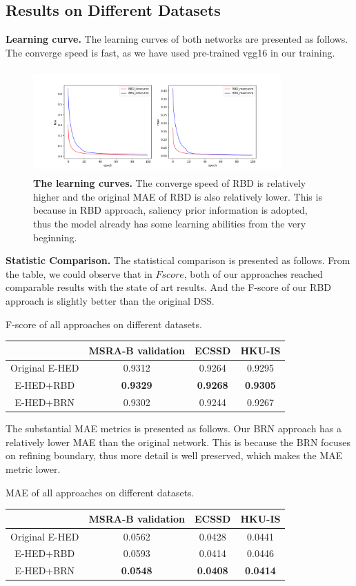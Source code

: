 \documentclass[10pt,journal, compsoc]{IEEEtran}
\begin{document}
\subsection{Results on Different Datasets}
\noindent\textbf{Learning curve.} The learning curves of both networks are presented as follows. The converge speed is fast, as we have used pre-trained vgg16 in our training.
\begin{figure}[!htbp]
	\centering
	\includegraphics[height=4cm,width=9.5cm]{figures/lrcurve.png}
	\caption{\textbf{The learning curves.}  The converge speed of RBD is relatively higher and the original MAE of RBD is also relatively lower. This is because in RBD approach, saliency prior information is adopted, thus the model already has some learning abilities from the very beginning.}
\end{figure}

\noindent\textbf{Statistic Comparison.} The statistical comparison is presented as follows. From the table, we could observe that in $Fscore$, both of our approaches reached comparable results with the state of art results. And the F-score of our RBD approach is slightly better than the original DSS. 
\begin{table}[!htbp]
	\centering
	\tablename{ F-score of all approaches on different datasets.}
	\begin{tabular}[I]{cccc}
		\hline
		& MSRA-B validation& ECSSD&HKU-IS\\
		\hline
		Original E-HED& 0.9312 & 0.9264 & 0.9295 \\
		E-HED+RBD&\textbf{0.9329}& \textbf{0.9268}& \textbf{0.9305} \\
		E-HED+BRN& 0.9302& 0.9244& 0.9267 \\
		\hline
	\end{tabular}
\end{table}

The substantial MAE metrics is presented as follows. Our BRN approach has a relatively lower MAE than the original network. This is because the BRN focuses on refining boundary, thus more detail is well preserved, which makes the MAE metric lower. 
\begin{table}[!htbp]
	\centering
	\tablename{ MAE of all approaches on different datasets.}
	\begin{tabular}[I]{cccc}
		\hline
		& MSRA-B validation& ECSSD&HKU-IS\\
		\hline
		Original E-HED& 0.0562 & 0.0428 & 0.0441 \\
		E-HED+RBD& 0.0593& 0.0414& 0.0446 \\
		E-HED+BRN& \textbf{0.0548}& \textbf{0.0408}& \textbf{0.0414}\\
		\hline
	\end{tabular}
\end{table}
\end{document}
